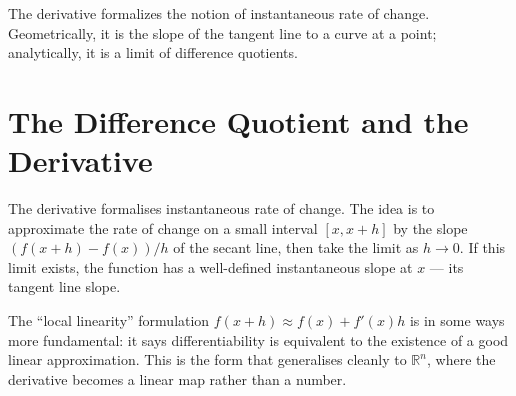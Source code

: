 \documentclass[12pt, openany]{book}
\theoremstyle{plain}
\theoremstyle{definition}
\theoremstyle{remark}
\newcommand{\R}{\mathbb{R}}
\begin{document}
The derivative formalizes the notion of instantaneous rate of change. Geometrically, it is the slope of the tangent line to a curve at a point; analytically, it is a limit of difference quotients.

\section{The Difference Quotient and the Derivative}

The derivative formalises instantaneous rate of change.  The idea is to approximate the rate of change on a small interval $[x, x+h]$ by the slope $(f(x+h)-f(x))/h$ of the secant line, then take the limit as $h \to 0$.  If this limit exists, the function has a well-defined instantaneous slope at $x$ --- its tangent line slope.

The ``local linearity'' formulation $f(x+h) \approx f(x) + f'(x)h$ is in some ways more fundamental: it says differentiability is equivalent to the existence of a good linear approximation.  This is the form that generalises cleanly to $\R^n$, where the derivative becomes a linear map rather than a number.
\end{document}
